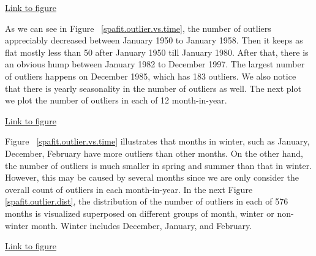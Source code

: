 \begin{framed}
\begin{center}
  \href{../plots/a1950/spafit/d2/span0.015/a1950.outliersCountvsTime.pdf}
  {Link to figure}
  \label{spafit.outlier.vs.time}
\end{center}
\end{framed}

As we can see in Figure~
\href{../plots/a1950/spafit/d2/span0.015/a1950.outliersCountvsTime.pdf}
{\ref*{spafit.outlier.vs.time}}, the number of outliers appreciably decreased
between January 1950 to January 1958. Then it keeps as flat mostly less than 50
after January 1950 till January 1980. After that, there is an obvious hump
between January 1982 to December 1997. The largest number of outliers happens on
December 1985, which has 183 outliers. We also notice that there is yearly 
seasonality in the number of outliers as well. The next plot we plot the number
of outliers in each of 12 month-in-year.

\begin{framed}
\begin{center}
  \href{../plots/a1950/spafit/d2/span0.015/a1950.outliersCountCondmonth.pdf}
  {Link to figure}
  \label{spafit.outlier.vs.time}
\end{center}
\end{framed}

Figure~
\href{../plots/a1950/spafit/d2/span0.015/a1950.outliersCountCondmonth.pdf}
{\ref*{spafit.outlier.vs.time}} illustrates that months in winter, such as
January, December, February have more outliers than other months. On the other
hand, the number of outliers is much smaller in spring and summer than that in
winter. However, this may be caused by several months since we are only consider
the overall count of outliers in each month-in-year. In the next Figure~
\href{../plots/a1950/spafit/d2/span0.015/a1950.outliersCountbystation.pdf}
{\ref*{spafit.outlier.dist}}, the distribution of the number of outliers in each
of 576 months is visualized superposed on different groups of month, winter or
non-winter month. Winter includes December, January, and February. 

\begin{framed}
\begin{center}
  \href{../plots/a1950/spafit/d2/span0.015/a1950.outliersCountmonthWinter.pdf}
  {Link to figure}
  \label{spafit.outlier.dist}
\end{center}
\end{framed}

